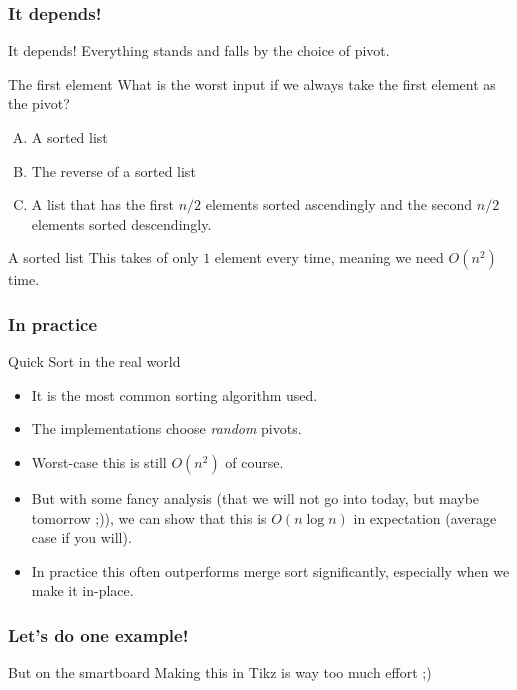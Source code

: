 \begin{frame}
	\frametitle{It depends!}

	\begin{block}{It depends!}
		Everything stands and falls by the choice of pivot.
	\end{block}
	\pause
	\begin{block}{The first element}
		What is the worst input if we always take the first element as the pivot?
		\begin{enumerate}[A.]
			\item A sorted list
			\item The reverse of a sorted list
			\item A list that has the first $n/2$ elements sorted ascendingly and the second $n/2$ elements sorted descendingly.
		\end{enumerate}
	\end{block}
	\pause
	\begin{block}{A sorted list}
	 This takes of only $1$ element every time, meaning we need $O(n^2)$ time.	
	\end{block}
\end{frame}

\begin{frame}
	\frametitle{In practice}
	
		\begin{block}{Quick Sort in the real world}
			\begin{itemize}
				\item It is the most common sorting algorithm used.
				\item The implementations choose \textit{random} pivots.
					\pause
				\item Worst-case this is still $O(n^2)$ of course.
					\pause
				\item But with some fancy analysis (that we will not go into today, but maybe tomorrow ;)), we can show that
					this is $O(n \log n)$ in expectation (average case if you will).
					\pause
				\item In practice this often outperforms merge sort significantly, especially when we make it in-place.
			\end{itemize}
		\end{block}	
\end{frame}

\begin{frame}
	\frametitle{Let's do one example!}
	\begin{block}{But on the smartboard}
		Making this in Tikz is way too much effort ;)
	\end{block}		
\end{frame}


